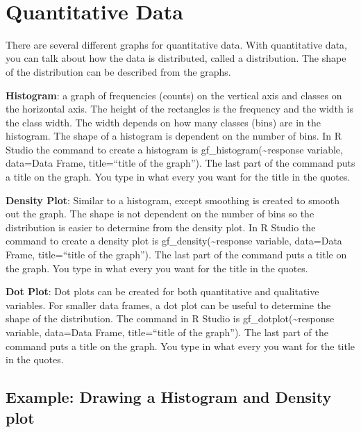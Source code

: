 \documentclass[]{book}
\begin{document}
\emph{\\
}

\hypertarget{quantitative-data}{%
\section{Quantitative Data}\label{quantitative-data}}

There are several different graphs for quantitative data. With quantitative data, you can talk about how the data is distributed, called a distribution. The shape of the distribution can be described from the graphs.

\textbf{Histogram}: a graph of frequencies (counts) on the vertical axis and classes on the horizontal axis. The height of the rectangles is the frequency and the width is the class width. The width depends on how many classes (bins) are in the histogram. The shape of a histogram is dependent on the number of bins. In R Studio the command to create a histogram is gf\_histogram(\textasciitilde{}response variable, data=Data Frame, title=``title of the graph''). The last part of the command puts a title on the graph. You type in what every you want for the title in the quotes.

\textbf{Density Plot}: Similar to a histogram, except smoothing is created to smooth out the graph. The shape is not dependent on the number of bins so the distribution is easier to determine from the density plot. In R Studio the command to create a density plot is gf\_density(\textasciitilde{}response variable, data=Data Frame, title=``title of the graph''). The last part of the command puts a title on the graph. You type in what every you want for the title in the quotes.

\textbf{Dot Plot}: Dot plots can be created for both quantitative and qualitative variables. For smaller data frames, a dot plot can be useful to determine the shape of the distribution. The command in R Studio is gf\_dotplot(\textasciitilde{}response variable, data=Data Frame, title=``title of the graph''). The last part of the command puts a title on the graph. You type in what every you want for the title in the quotes.

\hypertarget{example-drawing-a-histogram-and-density-plot}{%
\subsection{Example: Drawing a Histogram and Density plot}\label{example-drawing-a-histogram-and-density-plot}}
\end{document}
